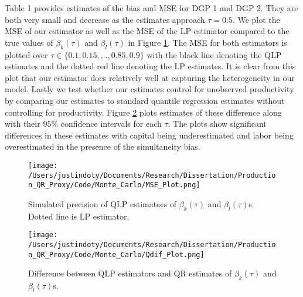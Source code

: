 \documentclass[11pt]{article}
\begin{document}
Table 1 provides estimates of the bias and MSE for DGP 1 and DGP 2. They are both very small and decrease as the estimates approach $\tau=0.5$. We plot the MSE of our estimator as well as the MSE of the LP estimator compared to the true values of $\beta_{k}(\tau)$ and $\beta_{l}(\tau)$ in Figure \ref{fig:MSE}. The MSE for both estimators is plotted over $\tau\in\{0.1, 0.15, \dots, 0.85, 0.9\}$ with the black line denoting the QLP estimates and the dotted red line denoting the LP estimates. It is clear from this plot that our estimator does relatively well at capturing the heterogeneity in our model. Lastly we test whether our estimates control for unobserved productivity by comparing our estimates to standard quantile regression estimates without controlling for productivity. Figure \ref{fig:QDIF} plots estimates of these difference along with their $95\%$ confidence intervals for each $\tau$. The plots show significant differences in these estimates with capital being underestimated and labor being overestimated in the presence of the simultaneity bias.



\begin{figure}[H]
\centering
\caption{Simulated precision of  QLP estimators of $\beta_{k}(\tau)$ and $\beta_{l}(\tau)$s. Dotted line is LP estimator.}
\texttt{[image: /Users/justindoty/Documents/Research/Dissertation/Production\_QR\_Proxy/Code/Monte\_Carlo/MSE\_Plot.png]}
\label{fig:MSE}
\end{figure}

\begin{figure}[ht]
\centering
\caption{Difference between QLP estimators and QR estimates of $\beta_{k}(\tau)$ and $\beta_{l}(\tau)$s.}
\texttt{[image: /Users/justindoty/Documents/Research/Dissertation/Production\_QR\_Proxy/Code/Monte\_Carlo/Qdif\_Plot.png]}
\label{fig:QDIF}
\end{figure}

\newpage
\end{document}
